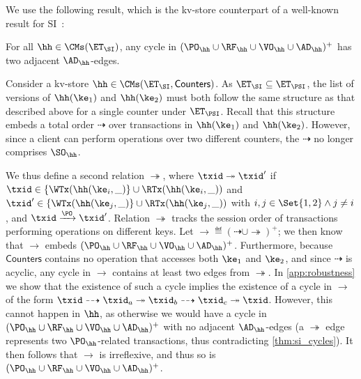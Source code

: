 We use the following result, which is the kv-store counterpart of a well-known result for SI~\cite{feketeSI,SIanalysis}: 
\begin{theorem}
\label{thm:si_cycles}
For all $\hh \in \CMs(\ET_{\SI})$, any cycle in $(\PO_{\hh} \cup \RF_{\hh} \cup \VO_{\hh} \cup \AD_{\hh})^+$ has two adjacent $\AD_{\hh}$-edges.
\end{theorem}

Consider a kv-store $\hh \in \CMs(\ET_{\SI}, \mathsf{Counters})$. 
As $\ET_{\SI} \subseteq \ET_{\PSI}$, the list of versions of $\hh(\ke_1)$ and $\hh(\ke_2)$ 
must both follow the same structure as that described above for a single counter under $\ET_{\PSI}$. 
Recall that this structure embeds a total order $\dashrightarrow$ over transactions in $\hh(\ke_1)$ and $\hh(\ke_2)$.
However, since a client can perform operations over two different counters, the $\dashrightarrow$ no longer comprises $\SO_{\hh}$. 

We thus define a second relation $\twoheadrightarrow$, where
$\txid \twoheadrightarrow \txid'$ if $\txid \in \{\WTx(\hh(\ke_{i}, \_)\} \cup \RTx(\hh(\ke_{i}, \_))$ 
and $\txid' \in \{\WTx(\hh(\ke_{j}, \_)\} \cup \RTx(\hh(\ke_{j}, \_))$ with $i,j \in \Set{1,2} \land j \neq i$,  
and $\txid \xrightarrow{\PO} \txid'$.
Relation $\twoheadrightarrow$ tracks the session order of transactions performing operations on different keys. 
Let $\rightarrow \eqdef (\dashrightarrow \cup \twoheadrightarrow)^{+}$; 
we then know that $\rightarrow$ embeds $(\PO_{\hh} \cup \RF_{\hh} \cup \VO_{\hh} \cup \AD_{\hh})^{+}$.
Furthermore, because $\mathsf{Counters}$ contains no operation that accesses both $\ke_1$ and $\ke_2$, and since $\dashrightarrow$ is acyclic, 
any cycle in $\rightarrow$ contains at least two edges from $\twoheadrightarrow$. 
In \cref{app:robustness} we show that the existence of such a cycle implies the 
existence of a cycle in $\rightarrow$ of the form $\txid \dashrightarrow \txid_{a} \twoheadrightarrow 
\txid_{b} \dashrightarrow \txid_{c} \twoheadrightarrow \txid$. 
However, this cannot happen in $\hh$, as otherwise we would have a cycle in $(\PO_{\hh} \cup \RF_{\hh} \cup \VO_{\hh} \cup \AD_{\hh})^{+}$ with no adjacent $\AD_{\hh}$-edges (a $\twoheadrightarrow$ edge represents two  $\PO_{\hh}$-related transactions, 
thus contradicting \cref{thm:si_cycles}). 
It then follows that $\rightarrow$ is irreflexive, and thus so is $(\PO_{\hh} \cup \RF_{\hh} \cup \VO_{\hh} \cup \AD_{\hh})^+$.

